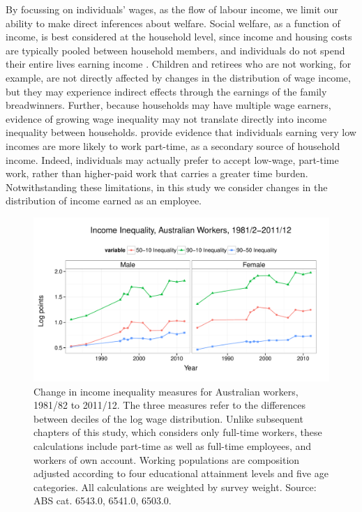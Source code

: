 By focussing on individuals' wages, as the flow of labour income, we limit our ability to make direct inferences about welfare. Social welfare, as a function of income, is best considered at the household level, since income and housing costs are typically pooled between household members, and individuals do not spend their entire lives earning income \citep{Richardson1999,Borland1999}. Children and retirees who are not working, for example, are not directly affected by changes in the distribution of wage income, but they may experience indirect effects through the earnings of the family breadwinners. Further, because households may have multiple wage earners, evidence of growing wage inequality may not translate directly into income inequality between households. \citet{Richardson1999} provide evidence that individuals earning very low incomes are more likely to work part-time, as a secondary source of household income. Indeed, individuals may actually prefer to accept low-wage, part-time work, rather than higher-paid work that carries a greater time burden. Notwithstanding these limitations, in this study we consider changes in the distribution of income earned as an employee.

\begin{figure}[h]
  \centering
  \includegraphics[width=\textwidth]{../figure/ineq_time.pdf}
  \caption{Change in income inequality measures for Australian workers, 1981/82 to 2011/12. The three measures refer to the differences between deciles of the log wage distribution. Unlike subsequent chapters of this study, which considers only full-time workers, these calculations include part-time as well as full-time employees, and workers of own account. Working populations are composition adjusted according to four educational attainment levels and five age categories. All calculations are weighted by survey weight. Source: ABS cat. 6543.0, 6541.0, 6503.0.}
\end{figure}

